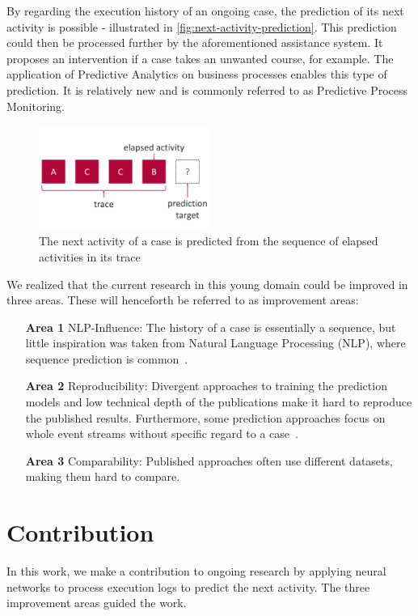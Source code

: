 By regarding the execution history of an ongoing case, the prediction of its next activity is possible - illustrated in \autoref{fig:next-activity-prediction}. This prediction could then be processed further by the aforementioned assistance system. It proposes an intervention if a case takes an unwanted course, for example. The application of Predictive Analytics on business processes enables this type of prediction. It is relatively new and is commonly referred to as Predictive Process Monitoring.

\begin{figure}
    \centering
    \includegraphics[width=0.5\textwidth]{gfx/next-activity-prediction.pdf}
    \caption[Next-activity prediction from a trace]{The next activity of a case is predicted from the sequence of elapsed activities in its trace}
    \label{fig:next-activity-prediction}
\end{figure}

We realized that the current research in this young domain could be improved in three areas. These will henceforth be referred to as improvement areas:

\begin{enumerate}
  \item[\textbf{Area 1}] NLP-Influence: The history of a case is essentially a sequence, but little inspiration was taken from Natural Language Processing (NLP), where sequence prediction is common~\cite{shibata2016bipartite, kokkinos2017structural}.
  \item[\textbf{Area 2}] Reproducibility: Divergent approaches to training the prediction models and low technical depth of the publications make it hard to reproduce the published results. Furthermore, some prediction approaches focus on whole event streams without specific regard to a case~\cite{evermann2016, schoenig2018}.
  \item[\textbf{Area 3}] Comparability: Published approaches often use different datasets, making them hard to compare.
\end{enumerate}

\section{Contribution}\label{sec:intro:contribution}
In this work, we make a contribution to ongoing research by applying neural networks to process execution logs to predict the next activity. The three improvement areas guided the work.

